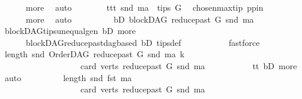 \begin{isabellebody}
\ \ \ \ \ \ more\ \isamarkupfalse%
\ auto\isanewline
\ \ \ \ \ \ \isamarkupfalse%
\ ttt{\isacharcolon}{\kern0pt}\ {\isachardoublequoteopen}snd\ ma\ {\isasymin}\ tips\ G{\isachardoublequoteclose}\ \isamarkupfalse%
\ chosen{\isacharunderscore}{\kern0pt}max{\isacharunderscore}{\kern0pt}tip{\isacharparenleft}{\kern0pt}{}{\isacharparenright}{\kern0pt}\ pp{\isacharunderscore}{\kern0pt}in\isanewline
\ \ \ \ \ \ more\ \isamarkupfalse%
\ auto\isanewline
\ \ \ \ \ \ \isamarkupfalse%
\ \isamarkupfalse%
\ bD{}{\isacharcolon}{\kern0pt}\ {\isachardoublequoteopen}blockDAG\ {\isacharparenleft}{\kern0pt}reduce{\isacharunderscore}{\kern0pt}past\ G\ {\isacharparenleft}{\kern0pt}snd\ ma{\isacharparenright}{\kern0pt}{\isacharparenright}{\kern0pt}{\isachardoublequoteclose}\ \isamarkupfalse%
\ blockDAG{\isachardot}{\kern0pt}tips{\isacharunderscore}{\kern0pt}unequal{\isacharunderscore}{\kern0pt}gen\ bD\ more\ \isanewline
\ \ \ \ \ \ blockDAG{\isachardot}{\kern0pt}reduce{\isacharunderscore}{\kern0pt}past{\isacharunderscore}{\kern0pt}dagbased\ bD\ tips{\isacharunderscore}{\kern0pt}def\ \isanewline
\ \ \ \ \ \ \ \ \isamarkupfalse%
\ fastforce\isanewline
\ \ \ \ \ \ \isamarkupfalse%
\ \isamarkupfalse%
\ {\isachardoublequoteopen}length\ {\isacharparenleft}{\kern0pt}snd\ {\isacharparenleft}{\kern0pt}OrderDAG\ {\isacharparenleft}{\kern0pt}reduce{\isacharunderscore}{\kern0pt}past\ G\ {\isacharparenleft}{\kern0pt}snd\ ma{\isacharparenright}{\kern0pt}{\isacharparenright}{\kern0pt}\ k{\isacharparenright}{\kern0pt}{\isacharparenright}{\kern0pt}\ \isanewline
\ \ \ \ \ \ \ \ \ \ \ \ \ \ \ \ \ \ {\isacharequal}{\kern0pt}\ card\ {\isacharparenleft}{\kern0pt}verts\ {\isacharparenleft}{\kern0pt}reduce{\isacharunderscore}{\kern0pt}past\ G\ {\isacharparenleft}{\kern0pt}snd\ ma{\isacharparenright}{\kern0pt}{\isacharparenright}{\kern0pt}{\isacharparenright}{\kern0pt}{\isachardoublequoteclose}\isanewline
\ \ \ \ \ \ \ \ \isamarkupfalse%
\ {}\ tt\ bD{}\ more\ \isamarkupfalse%
\ auto\isanewline
\ \ \ \ \ \ \isamarkupfalse%
\ \isamarkupfalse%
\ {\isachardoublequoteopen}length\ {\isacharparenleft}{\kern0pt}snd\ {\isacharparenleft}{\kern0pt}fst\ ma{\isacharparenright}{\kern0pt}{\isacharparenright}{\kern0pt}\ \isanewline
\ \ \ \ \ \ \ \ \ \ \ \ \ \ \ \ \ \ {\isacharequal}{\kern0pt}\ card\ {\isacharparenleft}{\kern0pt}verts\ {\isacharparenleft}{\kern0pt}reduce{\isacharunderscore}{\kern0pt}past\ G\ {\isacharparenleft}{\kern0pt}snd\ ma{\isacharparenright}{\kern0pt}{\isacharparenright}{\kern0pt}{\isacharparenright}{\kern0pt}{\isachardoublequoteclose}\isanewline

\end{isabellebody}
